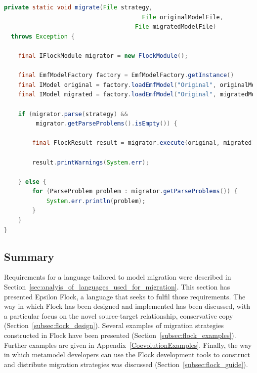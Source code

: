 \begin{lstlisting}[caption=Executing a Flock migration strategy programmatically in Java., label=lst:flock_module_usage, language=Java, float=tb]
private static void migrate(File strategy,
	                                   File originalModelFile,
                                     File migratedModelFile)
  throws Exception {
	
	final IFlockModule migrator = new FlockModule();
	
	final EmfModelFactory factory = EmfModelFactory.getInstance()
	final IModel original = factory.loadEmfModel("Original", originalModelFile, "originalMetamodelUri");
	final IModel migrated = factory.loadEmfModel("Original", migratedModelFile, "evolvedMetamodelUri");
	
	if (migrator.parse(strategy) &&
	     migrator.getParseProblems().isEmpty()) {		
		
		final FlockResult result = migrator.execute(original, migrated);
	
		result.printWarnings(System.err);
		
	} else {
		for (ParseProblem problem : migrator.getParseProblems()) {
			System.err.println(problem);
		}
	}
}
\end{lstlisting}


\subsection{Summary}
Requirements for a language tailored to model migration were described in Section~\ref{sec:analyis_of_languages_used_for_migration}. This section has presented Epsilon Flock, a language that seeks to fulfil those requirements. The way in which Flock has been designed and implemented has been discussed, with a particular focus on the novel source-target relationship, conservative copy (Section~\ref{subsec:flock_design}). Several examples of migration strategies constructed in Flock have been presented (Section~\ref{subsec:flock_examples}). Further examples are given in Appendix~\ref{CoevolutionExamples}. Finally, the way in which metamodel developers can use the Flock development tools to construct and distribute migration strategies was discussed (Section~\ref{subsec:flock_guide}).

